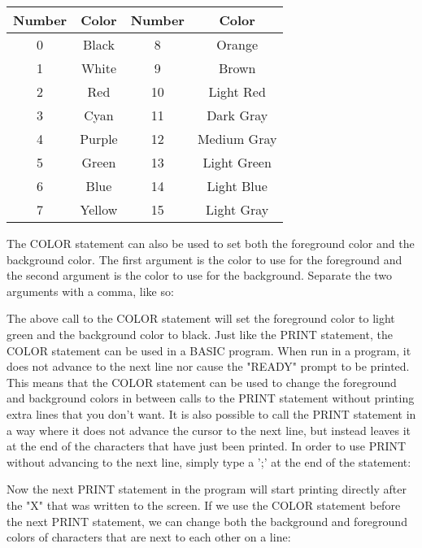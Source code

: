 \begin{tabular}{|c|c|c|c|}
	\hline
	Number & Color & Number & Color\\ \hline
	0 & Black & 8 & Orange \\ \hline
	1 & White & 9 & Brown \\ \hline
	2 & Red & 10 & Light Red \\ \hline
	3 & Cyan & 11 & Dark Gray\\ \hline
	4 & Purple & 12 & Medium Gray\\ \hline
	5 & Green & 13 & Light Green\\ \hline
	6 & Blue & 14 & Light Blue\\ \hline
	7 & Yellow & 15 & Light Gray\\ \hline
\end{tabular}

\vspace{16pt}

The {\ttfamily COLOR} statement can also be used to set both the foreground
color and the background color.  The first argument is the color to use for the
foreground and the second argument is the color to use for the background.
Separate the two arguments with a comma, like so:\\


The above call to the {\ttfamily COLOR} statement will set the foreground color
to light green and the background color to black.  Just like the {\ttfamily
PRINT} statement, the {\ttfamily COLOR} statement can be used in a BASIC
program.  When run in a program, it does not advance to the next line nor cause
the "READY" prompt to be printed.  This means that the {\ttfamily COLOR}
statement can be used to change the foreground and background colors in between
calls to the {\ttfamily PRINT} statement without printing extra lines that you
don't want.  It is also possible to call the {\ttfamily PRINT} statement in a
way where it does not advance the cursor to the next line, but instead leaves
it at the end of the characters that have just been printed.  In order to use
{\ttfamily PRINT} without advancing to the next line, simply type a ';' at the
end of the statement:\\


Now the next {\ttfamily PRINT} statement in the program will start printing
directly after the "X" that was written to the screen.  If we use the
{\ttfamily COLOR} statement before the next {\ttfamily PRINT} statement, we can
change both the background and foreground colors of characters that are next to
each other on a line:\\


